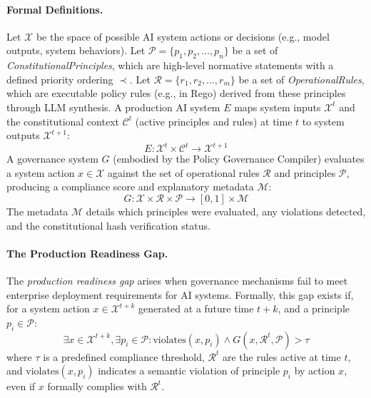 \documentclass[manuscript,screen,9pt]{acmart}
\begin{document}
\paragraph{Formal Definitions.} Let $\mathcal{X}$ be the space of possible AI system actions or decisions (e.g., model outputs, system behaviors). Let $\mathcal{P} = \{p_1, p_2, \ldots, p_n\}$ be a set of \textit{ConstitutionalPrinciples}, which are high-level normative statements with a defined priority ordering $\prec$. Let $\mathcal{R} = \{r_1, r_2, \ldots, r_m\}$ be a set of \textit{OperationalRules}, which are executable policy rules (e.g., in Rego) derived from these principles through LLM synthesis. A production AI system $E$ maps system inputs $\mathcal{X}^t$ and the constitutional context $\mathcal{C}^t$ (active principles and rules) at time $t$ to system outputs $\mathcal{X}^{t+1}$:
\begin{equation}
E: \mathcal{X}^t \times \mathcal{C}^t \rightarrow \mathcal{X}^{t+1}
\end{equation}
A governance system $G$ (embodied by the Policy Governance Compiler) evaluates a system action $x \in \mathcal{X}$ against the set of operational rules $\mathcal{R}$ and principles $\mathcal{P}$, producing a compliance score and explanatory metadata $\mathcal{M}$:
\begin{equation}
G: \mathcal{X} \times \mathcal{R} \times \mathcal{P} \rightarrow [0,1] \times \mathcal{M}
\end{equation}
The metadata $\mathcal{M}$ details which principles were evaluated, any violations detected, and the constitutional hash verification status.

\paragraph{The Production Readiness Gap.} The \textit{production readiness gap} arises when governance mechanisms fail to meet enterprise deployment requirements for AI systems. Formally, this gap exists if, for a system action $x \in \mathcal{X}^{t+k}$ generated at a future time $t+k$, and a principle $p_i \in \mathcal{P}$:
\[\exists x \in \mathcal{X}^{t+k}, \exists p_i \in \mathcal{P}: \text{violates}(x, p_i) \land G(x, \mathcal{R}^t, \mathcal{P}) > \tau\]
where $\tau$ is a predefined compliance threshold, $\mathcal{R}^t$ are the rules active at time $t$, and $\text{violates}(x, p_i)$ indicates a semantic violation of principle $p_i$ by action $x$, even if $x$ formally complies with $\mathcal{R}^t$.
\end{document}
